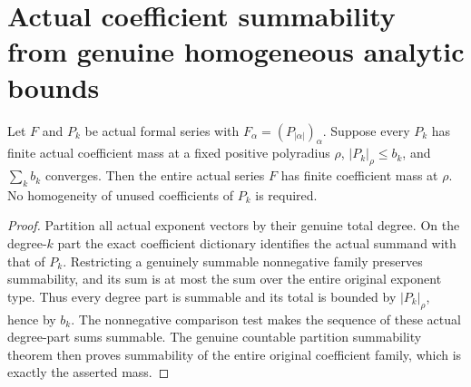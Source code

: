 \section{Actual coefficient summability from genuine homogeneous analytic bounds}

\begin{theorem}
\label{hir:actual-degree-band-coefficient-summability}
Let $F$ and $P_k$ be actual formal series with
$F_\alpha=(P_{|\alpha|})_\alpha$. Suppose every $P_k$ has finite
actual coefficient mass at a fixed positive polyradius $\rho$,
$|P_k|_\rho\leq b_k$, and $\sum_k b_k$ converges. Then the entire
actual series $F$ has finite coefficient mass at $\rho$.
No homogeneity of unused coefficients of $P_k$ is required.
\leanok
\end{theorem}
\begin{proof}
Partition all actual exponent vectors by their genuine total degree.
On the degree-$k$ part the exact coefficient dictionary identifies
the actual summand with that of $P_k$. Restricting a genuinely
summable nonnegative family preserves summability, and its sum is
at most the sum over the entire original exponent type. Thus every
degree part is summable and its total is bounded by $|P_k|_\rho$,
hence by $b_k$. The nonnegative comparison test makes the sequence
of these actual degree-part sums summable. The genuine countable
partition summability theorem then proves summability of the entire
original coefficient family, which is exactly the asserted mass.
\end{proof}

